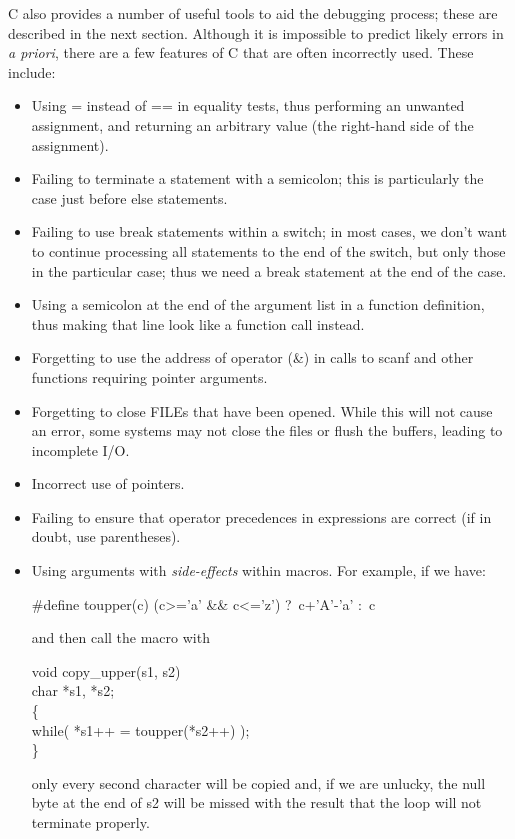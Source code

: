     C also  provides a  number of  useful tools to aid the debugging
process; these are  described in the next section. Although it is
impossible to predict likely errors  in  {\em a priori\/},
there are a few features of C that are often incorrectly used. These
include:
\begin{itemize}

\item Using  {\cd =} instead  of {\cd ==}  in  equality  tests,  thus 
performing  an unwanted assignment, and returning an arbitrary value
(the right-hand side of the assignment).

\item Failing  to  terminate  a  statement  with  a  semicolon;  this 
is particularly the case just before {\cd else} statements.

\item Failing  to use {\cd break} statements within a {\cd switch}; 
in most cases, we don't want  to continue  processing all  statements
to the end of the switch, but only those in the particular {\cd
case}; thus we need a {\cd break} statement at the end of the case.

\item Using  a semicolon  at the  end of  the argument list in a
function definition, thus  making that  line look  like  a  function 
call instead.

\item Forgetting to use the {\ms address of\/} operator ({\cd \&}) in
calls to {\cd scanf} and other functions requiring pointer arguments.

\item Forgetting  to close  {\cd FILE}s that  have been opened.  While
this will not cause an error, some systems may not close the files or
flush the buffers, leading to incomplete I/O.

\item Incorrect use of pointers.

\item Failing  to ensure  that operator precedences in expressions are
correct (if in doubt, use parentheses).

\item {}Using arguments with 
{\em side-effects} within macros. For example, if we have:
\begin{code}
\#define toupper(c) \tab (c>='a' \&\& c<='z') ?\ c+'A'-'a' :\ c
\end{code}
\noindent
and then call the macro with
\begin{code}
void copy\_upper(s1, s2) \\
\>char *s1, *s2; \\
\{ \\
\>while( *s1++ = toupper(*s2++) ); \\
\}
\end{code}
\noindent
only every second character will be copied and, if we are unlucky,
the null byte at the end of {\cd s2} will be missed with the result that the 
loop will not terminate properly.


\end{itemize}
